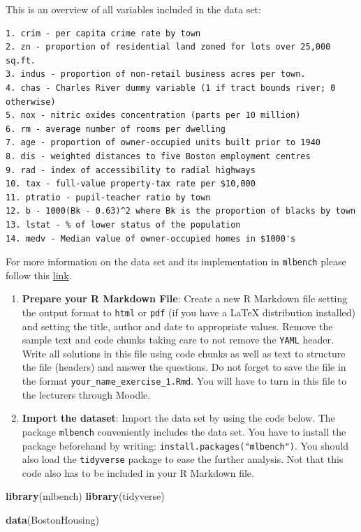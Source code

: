 \documentclass[
]{book}
\newenvironment{Shaded}{\begin{snugshade}}{\end{snugshade}}
\newcommand{\FunctionTok}[1]{\textcolor[rgb]{0.13,0.29,0.53}{\textbf{#1}}}
\newcommand{\NormalTok}[1]{#1}
\begin{document}
This is an overview of all variables included in the data set:

\begin{verbatim}
1. crim - per capita crime rate by town
2. zn - proportion of residential land zoned for lots over 25,000 sq.ft.
3. indus - proportion of non-retail business acres per town.
4. chas - Charles River dummy variable (1 if tract bounds river; 0 otherwise)
5. nox - nitric oxides concentration (parts per 10 million)
6. rm - average number of rooms per dwelling
7. age - proportion of owner-occupied units built prior to 1940
8. dis - weighted distances to five Boston employment centres
9. rad - index of accessibility to radial highways
10. tax - full-value property-tax rate per $10,000
11. ptratio - pupil-teacher ratio by town
12. b - 1000(Bk - 0.63)^2 where Bk is the proportion of blacks by town
13. lstat - % of lower status of the population
14. medv - Median value of owner-occupied homes in $1000's
\end{verbatim}

For more information on the data set and its implementation in \texttt{mlbench} please follow this \href{https://search.r-project.org/CRAN/refmans/mlbench/html/BostonHousing.html}{link}.

\begin{enumerate}
\def\labelenumi{\arabic{enumi}.}
\item
  \textbf{Prepare your R Markdown File}: Create a new R Markdown file setting the output format to \texttt{html} or \texttt{pdf} (if you have a LaTeX distribution installed) and setting the title, author and date to appropriate values. Remove the sample text and code chunks taking care to not remove the \texttt{YAML} header. Write all solutions in this file using code chunks as well as text to structure the file (headers) and answer the questions. Do not forget to save the file in the format \texttt{your\_name\_exercise\_1.Rmd}. You will have to turn in this file to the lecturers through Moodle.
\item
  \textbf{Import the dataset}: Import the data set by using the code below. The package \texttt{mlbench} conveniently includes the data set. You have to install the package beforehand by writing: \texttt{install.packages("mlbench")}. You should also load the \texttt{tidyverse} package to ease the further analysis. Not that this code also has to be included in your R Markdown file.
\end{enumerate}

\begin{Shaded}
\begin{Highlighting}[]
\FunctionTok{library}\NormalTok{(mlbench)}
\FunctionTok{library}\NormalTok{(tidyverse)}

\FunctionTok{data}\NormalTok{(BostonHousing)}
\end{Highlighting}
\end{Shaded}
\end{document}

